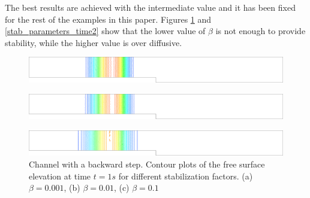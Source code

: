 The best results are achieved with the intermediate value and it has been fixed for the rest of the examples in this paper.
Figures \ref{stab_parameters_time1} and \ref{stab_parameters_time2} show that the lower value of $\beta$ is not enough to provide stability, while the higher value is over diffusive.

\begin{figure}[H]
\begin{subfigure}{.05\textwidth}
    \caption{}
\end{subfigure}
\begin{minipage}[c]{.94\textwidth}
    \includegraphics[width=\textwidth]{img/eulerian/step/stab_0.001_time_1.pdf}        
\end{minipage}
\par\medskip
\begin{subfigure}{.05\textwidth}
    \caption{}
\end{subfigure}
\begin{minipage}[c]{.94\textwidth}
    \includegraphics[width=\textwidth]{img/eulerian/step/stab_0.01_time_1.pdf}        
\end{minipage}
\par\medskip
\begin{subfigure}{.05\textwidth}
    \caption{}
\end{subfigure}
\begin{minipage}[c]{.94\textwidth}
    \includegraphics[width=\textwidth]{img/eulerian/step/stab_0.1_time_1.pdf}        
\end{minipage}
\caption{Channel with a backward step. Contour plots of the free surface elevation at time $t=1s$ for different stabilization factors. (a) $\beta=0.001$, (b) $\beta=0.01$, (c) $\beta=0.1$}
\label{stab_parameters_time1}
\end{figure}

